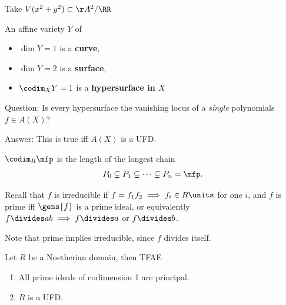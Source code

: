 \begin{example}

Take \(V(x^2+y^2) \subset \AA^2/\RR\)

\end{example}

\begin{definition}[?]

An affine variety \(Y\) of

\begin{itemize}
\tightlist
\item
  \(\dim Y = 1\) is a \textbf{curve},
\item
  \(\dim Y = 2\) is a \textbf{surface},
\item
  \(\codim_X Y = 1\) is a \textbf{hypersurface in \(X\)}
\end{itemize}

\end{definition}

Question: Is every hypersurface the vanishing locus of a \emph{single}
polynomials \(f\in A(X)\)?

Answer: This is true iff \(A(X)\) is a UFD.

\begin{definition}

\(\codim_R \mfp\) is the length of the longest chain
\begin{align*}P_0 \subsetneq P_1 \subsetneq \cdots \subsetneq P_n = \mfp.\end{align*}

\end{definition}

Recall that \(f\) is irreducible if
\(f = f_1 f_2 \implies f_i \in R\units\) for one \(i\), and \(f\) is
prime iff \(\gens{f}\) is a prime ideal, or equivalently
\(f\divides ab \implies f\divides a\) or \(f\divides b\).

Note that prime implies irreducible, since \(f\) divides itself.

\begin{proposition}[?]

Let \(R\) be a Noetherian domain, then TFAE

\begin{enumerate}
\def\labelenumi{\alph{enumi}.}
\item
  All prime ideals of codimension 1 are principal.
\item
  \(R\) is a UFD.
\end{enumerate}

\end{proposition}

